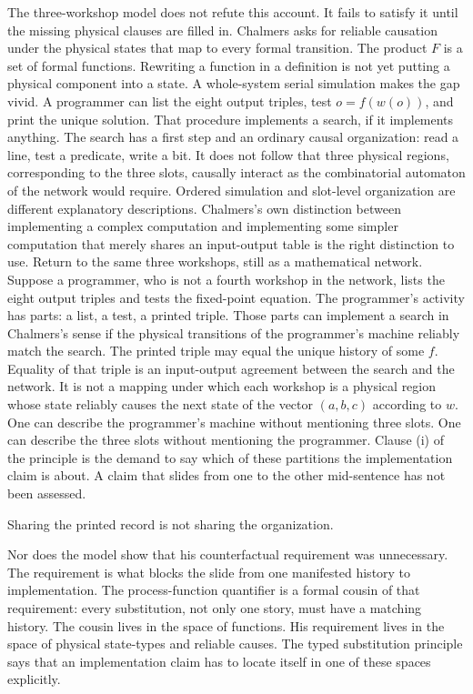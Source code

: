 \documentclass[12pt]{article}
\begin{document}
The three-workshop model does not refute this account. It fails to satisfy it until the missing physical clauses are filled in. Chalmers asks for reliable causation under the physical states that map to every formal transition. The product \(F\) is a set of formal functions. Rewriting a function in a definition is not yet putting a physical component into a state. A whole-system serial simulation makes the gap vivid. A programmer can list the eight output triples, test \(o=f(w(o))\), and print the unique solution. That procedure implements a search, if it implements anything. The search has a first step and an ordinary causal organization: read a line, test a predicate, write a bit. It does not follow that three physical regions, corresponding to the three slots, causally interact as the combinatorial automaton of the network would require. Ordered simulation and slot-level organization are different explanatory descriptions. Chalmers's own distinction between implementing a complex computation and implementing some simpler computation that merely shares an input-output table is the right distinction to use. Return to the same three workshops, still as a mathematical network. Suppose a programmer, who is not a fourth workshop in the network, lists the eight output triples and tests the fixed-point equation. The programmer's activity has parts: a list, a test, a printed triple. Those parts can implement a search in Chalmers's sense if the physical transitions of the programmer's machine reliably match the search. The printed triple may equal the unique history of some \(f\). Equality of that triple is an input-output agreement between the search and the network. It is not a mapping under which each workshop is a physical region whose state reliably causes the next state of the vector \((a,b,c)\) according to \(w\). One can describe the programmer's machine without mentioning three slots. One can describe the three slots without mentioning the programmer. Clause (i) of the principle is the demand to say which of these partitions the implementation claim is about. A claim that slides from one to the other mid-sentence has not been assessed.

Sharing the printed record is not sharing the organization.

Nor does the model show that his counterfactual requirement was unnecessary. The requirement is what blocks the slide from one manifested history to implementation. The process-function quantifier is a formal cousin of that requirement: every substitution, not only one story, must have a matching history. The cousin lives in the space of functions. His requirement lives in the space of physical state-types and reliable causes. The typed substitution principle says that an implementation claim has to locate itself in one of these spaces explicitly.
\end{document}
